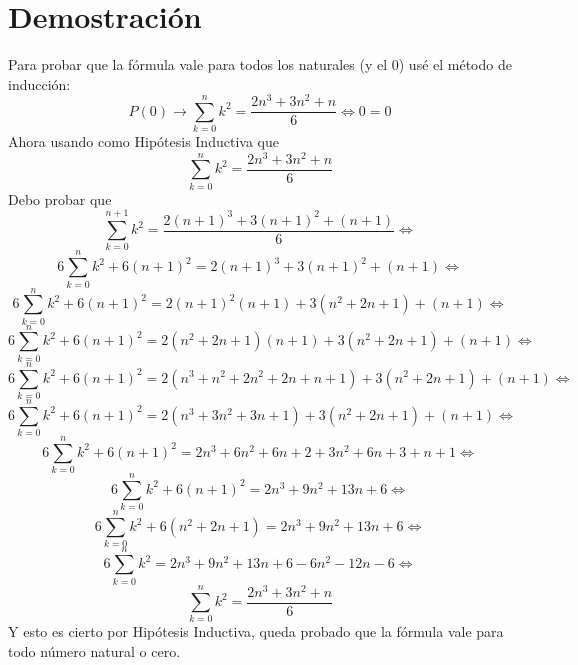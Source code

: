 \documentclass[a4paper,10pt]{article}
\begin{document}
\section{Demostraci\'on}
Para probar que la f\'ormula vale para todos los naturales (y el $0$) us\'e
el m\'etodo de inducci\'on:
\begin{equation}
P(0) \longrightarrow \sum_{k=0}^{n} k^2 = \frac{2n^3 + 3n^2 +n}{6}
\Longleftrightarrow 0 = 0
\end{equation}
Ahora usando como Hip\'otesis Inductiva que
\begin{displaymath}
\sum_{k=0}^{n} k^2 = \frac{2n^3 + 3n^2 +n}{6}
\end{displaymath}
Debo probar que
\begin{displaymath}
\sum_{k=0}^{n+1} k^2 = \frac{2(n+1)^3 + 3(n+1)^2 + (n+1)}{6} \Longleftrightarrow
\end{displaymath}
\begin{displaymath}
6 \sum_{k=0}^{n} k^2 + 6(n+1)^2 = 2(n+1)^3 + 3(n+1)^2 + (n+1) \Longleftrightarrow
\end{displaymath}
\begin{displaymath}
6 \sum_{k=0}^{n} k^2 + 6(n+1)^2 = 2(n+1)^2(n+1) + 3(n^2 + 2n + 1) + (n + 1) \Longleftrightarrow
\end{displaymath}
\begin{displaymath}
6 \sum_{k=0}^{n} k^2 + 6(n+1)^2 = 2(n^2 + 2n + 1)(n+1) + 3(n^2 + 2n + 1) + (n + 1) \Longleftrightarrow
\end{displaymath}
\begin{displaymath}
6 \sum_{k=0}^{n} k^2 + 6(n+1)^2 = 2(n^3 + n^2 + 2n^2 + 2n + n + 1) + 3(n^2 + 2n + 1) + (n + 1) \Longleftrightarrow
\end{displaymath}
\begin{displaymath}
6 \sum_{k=0}^{n} k^2 + 6(n+1)^2 = 2(n^3 + 3n^2 + 3n + 1) + 3(n^2 + 2n + 1) + (n + 1) \Longleftrightarrow
\end{displaymath}
\begin{displaymath}
6 \sum_{k=0}^{n} k^2 + 6(n+1)^2 = 2n^3 + 6n^2 + 6n + 2 + 3n^2 + 6n + 3 + n + 1 \Longleftrightarrow
\end{displaymath}
\begin{displaymath}
6 \sum_{k=0}^{n} k^2 + 6(n+1)^2 = 2n^3 + 9n^2 + 13n + 6 \Longleftrightarrow
\end{displaymath}
\begin{displaymath}
6 \sum_{k=0}^{n} k^2 + 6(n^2 + 2n + 1) = 2n^3 + 9n^2 + 13n + 6 \Longleftrightarrow
\end{displaymath}
\begin{displaymath}
6 \sum_{k=0}^{n} k^2 = 2n^3 + 9n^2 + 13n + 6 - 6n^2 - 12n - 6\Longleftrightarrow
\end{displaymath}
\begin{displaymath}
\sum_{k=0}^{n} k^2 = \frac{2n^3 + 3n^2 + n}{6}
\end{displaymath}
Y esto es cierto por Hip\'otesis Inductiva, queda probado que la f\'ormula vale
para todo n\'umero natural o cero.
\end{document}
